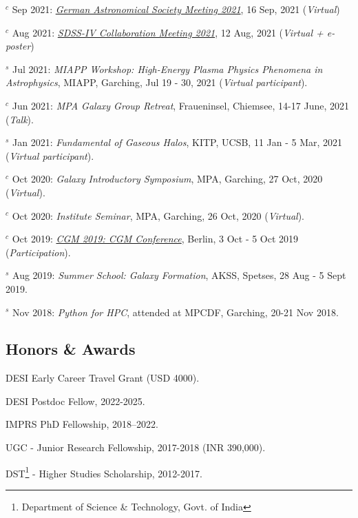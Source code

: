 \documentclass[12pt,letterpaper]{article}
\begin{document}
\begin{list}{}{\cvlist}
\item $^c$ Sep 2021:  \emph{\href{https://ag2021.astronomische-gesellschaft.de/view_splinter.php?session=Stars}{German Astronomical Society Meeting 2021}}, 16 Sep, 2021 (\textit{Virtual})   
\item $^c$ Aug 2021:  \emph{\href{https://jhu2021.sdss.org/}{SDSS-IV Collaboration Meeting 2021}}, 12 Aug, 2021 (\textit{Virtual + e-poster})   
\item $^s$ Jul 2021:  \emph{MIAPP Workshop: High-Energy Plasma Physics Phenomena in Astrophysics}, MIAPP, Garching, Jul 19 - 30, 2021 (\textit{Virtual participant}).  

\item $^c$ Jun 2021:  \emph{MPA Galaxy Group Retreat}, Fraueninsel, Chiemsee, 14-17 June, 2021 (\textit{Talk}).  
\item $^s$ Jan 2021:  \emph{Fundamental of Gaseous Halos}, KITP, UCSB, 11 Jan - 5 Mar, 2021 (\textit{Virtual participant}).  
\item $^c$ Oct 2020:  \emph{Galaxy Introductory Symposium}, MPA, Garching, 27 Oct, 2020 (\textit{Virtual}).  
\item $^c$ Oct 2020:  \emph{Institute Seminar}, MPA, Garching, 26 Oct, 2020 (\textit{Virtual}).  

\item $^c$ Oct 2019:  \emph{\href{https://wwwmpa.mpa-garching.mpg.de/conf/berlincgm2019/}{CGM 2019: CGM Conference}}, Berlin, 3 Oct - 5 Oct 2019 (\textit{Participation}).  
\item $^s$ Aug 2019:  \emph{Summer School: Galaxy Formation}, AKSS, Spetses, 28 Aug - 5 Sept 2019.  
\item $^s$ Nov 2018:  \emph{Python for HPC}, attended at MPCDF, Garching, 20-21 Nov 2018.  

\end{list}

\subsection{Honors \& Awards}
\begin{list}{}{\cvlist}
  \item DESI Early Career Travel Grant (USD 4000).
  \item DESI Postdoc Fellow, 2022-2025.
  \item IMPRS PhD Fellowship, 2018--2022.
  \item UGC - Junior Research Fellowship, 2017-2018 (INR 390,000).
  \item DST\footnote{Department of Science \& Technology, Govt. of India} - Higher Studies Scholarship, 2012-2017.

\end{list}
\end{document}
